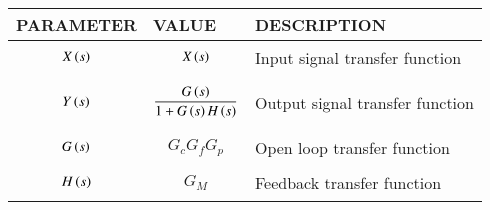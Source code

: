 \begin{tabular}{|p{2cm}|p{2cm}|p{4cm}|}
    \hline
    PARAMETER & VALUE & DESCRIPTION   \\ \hline
    $$X\left(s\right)$$ & $$X\left(s\right)$$ & Input signal transfer function  \\ \hline
    $$Y\left(s\right)$$ & $$\frac{G\left(s\right)}{1+G\left(s\right)H\left(s\right)}$$ & Output signal transfer function \\ \hline
    $$G\left(s\right)$$ & $$G_c G_f G_p$$ & Open loop transfer function    \\ \hline
    $$H\left(s\right)$$ & $$G_M$$ & Feedback transfer function    \\ \hline
\end{tabular}
